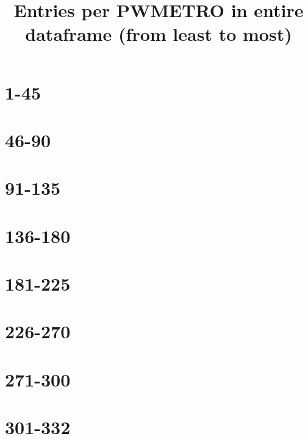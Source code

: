 \documentclass{article}
\begin{document}
\title{Entries per PWMETRO in entire dataframe (from least to most)}
\section{1-45}


\section{46-90}


\section{91-135}


\section{136-180}


\section{181-225}


\section{226-270}


\section{271-300}


\section{301-332}

\end{document}
